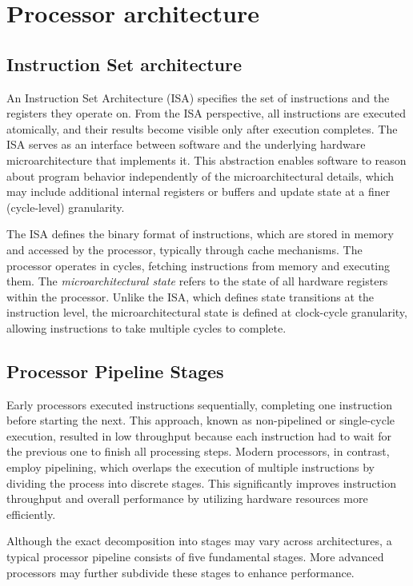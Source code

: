 \chapter{Processor architecture}
\label{chap:proc-arch}

\section{Instruction Set architecture}

An Instruction Set Architecture (ISA) specifies the set of instructions and the registers they operate on. From the ISA perspective, all instructions are executed atomically, and their results become visible only after execution completes. The ISA serves as an interface between software and the underlying hardware microarchitecture that implements it. This abstraction enables software to reason about program behavior independently of the microarchitectural details, which may include additional internal registers or buffers and update state at a finer (cycle-level) granularity.

The ISA defines the binary format of instructions, which are stored in memory and accessed by the processor, typically through cache mechanisms. The processor operates in cycles, fetching instructions from memory and executing them. The \textit{microarchitectural state} refers to the state of all hardware registers within the processor. Unlike the ISA, which defines state transitions at the instruction level, the microarchitectural state is defined at clock-cycle granularity, allowing instructions to take multiple cycles to complete.

\section{Processor Pipeline Stages}

Early processors executed instructions sequentially, completing one instruction before starting the next. This approach, known as non-pipelined or single-cycle execution, resulted in low throughput because each instruction had to wait for the previous one to finish all processing steps. Modern processors, in contrast, employ pipelining, which overlaps the execution of multiple instructions by dividing the process into discrete stages. This significantly improves instruction throughput and overall performance by utilizing hardware resources more efficiently.

Although the exact decomposition into stages may vary across architectures, a typical processor pipeline consists of five fundamental stages. More advanced processors may further subdivide these stages to enhance performance.

